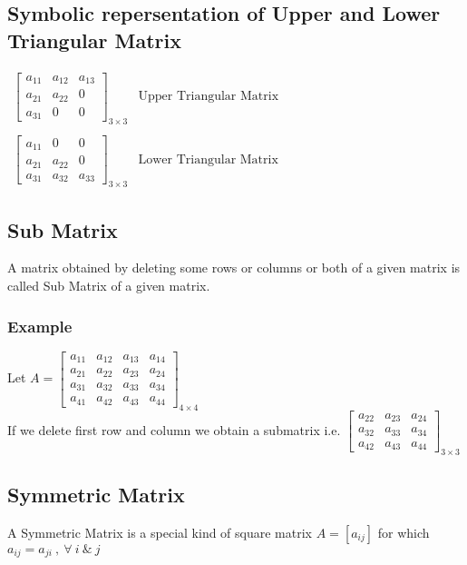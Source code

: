 \documentclass{article}
\begin{document}
	\subsection{Symbolic repersentation of Upper and Lower Triangular Matrix}
	$ \begin{array}{cc}
		{
			\left[ \begin{array}{ccc}
				a_{11} & a_{12} & a_{13} \\
				a_{21} & a_{22} & 0 \\
				a_{31} & 0 & 0
			\end{array}\right]
		}_{3 \times 3} & \text{Upper Triangular Matrix}
		\\ \\
		{
			\left[ \begin{array}{ccc}
				a_{11} & 0 & 0 \\
				a_{21} & a_{22} & 0 \\
				a_{31} & a_{32} & a_{33} 
			\end{array}\right]
		}_{3 \times 3} & \text{Lower Triangular Matrix}
	\end{array}
	$
	\subsection{Sub Matrix}
	A matrix obtained by deleting some rows or columns or both of a given matrix is called Sub Matrix of a given matrix.
	
	\subsubsection{Example}
	Let $ A = { \left[ \begin{array}{cccc}
		a_{11} & a_{12} & a_{13} & a_{14} \\
		a_{21} & a_{22} & a_{23} & a_{24} \\
		a_{31} & a_{32} & a_{33} & a_{34} \\
		a_{41} & a_{42} & a_{43} & a_{44}
	\end{array}\right] }_{4 \times 4} $ \\
	
	If we delete first row and column we obtain a submatrix i.e.
	$ { \left[ \begin{array}{ccc}
		a_{22} & a_{23} & a_{24} \\
		a_{32} & a_{33} & a_{34} \\
		a_{42} & a_{43} & a_{44}
	\end{array}\right] }_{3 \times 3}$

	\subsection{Symmetric Matrix}
	A Symmetric Matrix is a special kind of square matrix $ A = [a_{ij}] $ for which $ a_{ij} = a_{ji} ~,~ \forall ~ i ~ \& ~ j $
	
\end{document}
